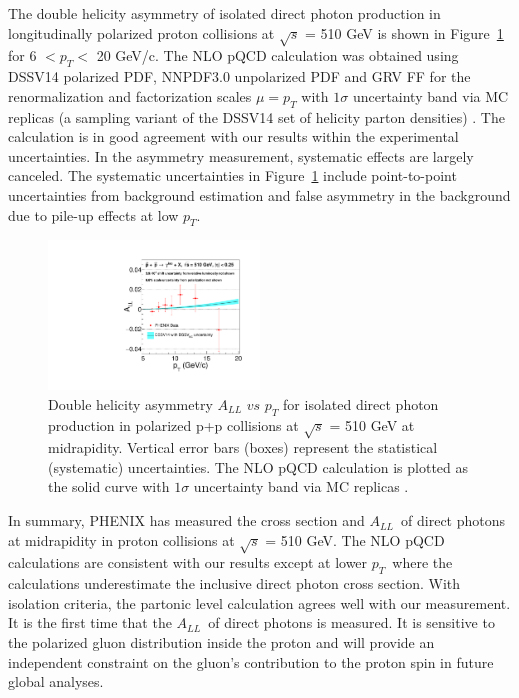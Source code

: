 \documentclass[twocolumn,letterpaper,aps,prl,longbibliography,superscriptaddress,floatfix]{revtex4-2}
\newcommand{\pT}{\ensuremath{p_T}}
\newcommand{\ALL}{\ensuremath{A_{LL}}}
\begin{document}
The double helicity asymmetry of isolated direct photon production in longitudinally polarized proton collisions at $\sqrt{s}$ = 510 GeV is shown in Figure~\ref{fig:all} for 6 $< p_{T} <$ 20 GeV/c. The NLO pQCD calculation was obtained using DSSV14 polarized PDF, NNPDF3.0 unpolarized PDF and GRV FF for the renormalization and factorization scales $\mu = p_T$ with $1\sigma$ uncertainty band via MC replicas (a sampling variant of the DSSV14 set of helicity parton densities) \cite{PhysRevLett.101.072001, PhysRevLett.113.012001, PhysRevD.100.114027}. The calculation is in good agreement with our results within the experimental uncertainties. In the asymmetry measurement, systematic effects are largely canceled. The systematic uncertainties in Figure~\ref{fig:all} include point-to-point uncertainties from background estimation and false asymmetry in the background due to pile-up effects at low \pT.

\begin{figure}
\centering
\includegraphics[width=0.5\textwidth]{IsoPhotonALL-beam2}
\caption{Double helicity asymmetry $A_{LL}$ $vs$ $p_{T}$ for isolated direct photon production in polarized p+p collisions at $\sqrt{s}$ = 510 GeV at midrapidity. Vertical error bars (boxes) represent the statistical (systematic) uncertainties. The NLO pQCD calculation is plotted as the solid curve with $1\sigma$ uncertainty band via MC replicas \cite{PhysRevLett.101.072001, PhysRevLett.113.012001, PhysRevD.100.114027}.}
\label{fig:all}
\end{figure}

In summary, PHENIX has measured the cross section and \ALL\ of direct photons at midrapidity in proton collisions at $\sqrt{s}$ = 510 GeV. The NLO pQCD calculations are consistent with our results except at lower \pT\ where the calculations underestimate the inclusive direct photon cross section. With isolation criteria, the partonic level calculation agrees well with our measurement. It is the first time that the \ALL\ of direct photons is measured. It is sensitive to the polarized gluon distribution inside the proton and will provide an independent constraint on the gluon’s contribution to the proton spin in future global analyses.
\end{document}
